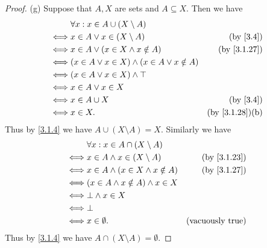 \begin{proof}{(g)}
  Suppose that \(A, X\) are sets and \(A \subseteq X\).
  Then we have
  \begin{align*}
         & \forall x : x \in A \cup (X \setminus A)                                              \\
    \iff & x \in A \lor x \in (X \setminus A)                     & \text{(by \cref{3.4})}       \\
    \iff & x \in A \lor (x \in X \land x \notin A)                & \text{(by \cref{3.1.27})}    \\
    \iff & (x \in A \lor x \in X) \land (x \in A \lor x \notin A)                                \\
    \iff & (x \in A \lor x \in X) \land \top                                                     \\
    \iff & x \in A \lor x \in X                                                                  \\
    \iff & x \in A \cup X                                         & \text{(by \cref{3.4})}       \\
    \iff & x \in X.                                               & \text{(by \cref{3.1.28})(b)}
  \end{align*}
  Thus by \cref{3.1.4} we have \(A \cup (X \setminus A) = X\).
  Similarly we have
  \begin{align*}
         & \forall x : x \in A \cap (X \setminus A)                             \\
    \iff & x \in A \land x \in (X \setminus A)      & \text{(by \cref{3.1.23})} \\
    \iff & x \in A \land (x \in X \land x \notin A) & \text{(by \cref{3.1.27})} \\
    \iff & (x \in A \land x \notin A) \land x \in X                             \\
    \iff & \bot \land x \in X                                                   \\
    \iff & \bot                                                                 \\
    \iff & x \in \emptyset.                         & \text{(vacuously true)}
  \end{align*}
  Thus by \cref{3.1.4} we have \(A \cap (X \setminus A) = \emptyset\).
\end{proof}

